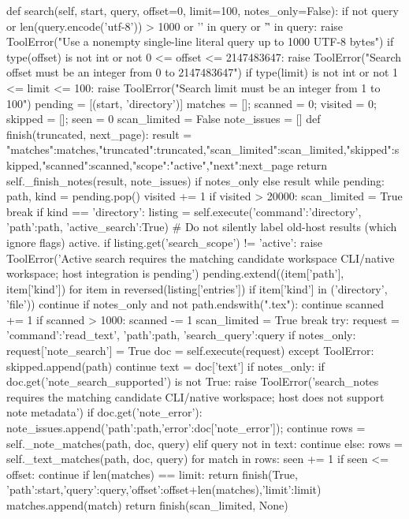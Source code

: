     def search(self, start, query, offset=0, limit=100, notes_only=False):
        if not query or len(query.encode('utf-8')) > 1000 or '\n' in query or '\r' in query:
            raise ToolError("Use a nonempty single-line literal query up to 1000 UTF-8 bytes")
        if type(offset) is not int or not 0 <= offset <= 2147483647:
            raise ToolError("Search offset must be an integer from 0 to 2147483647")
        if type(limit) is not int or not 1 <= limit <= 100:
            raise ToolError("Search limit must be an integer from 1 to 100")
        pending = [(start, 'directory')]
        matches = []; scanned = 0; visited = 0; skipped = []; seen = 0
        scan_limited = False
        note_issues = []
        def finish(truncated, next_page):
            result = {"matches":matches,"truncated":truncated,"scan_limited":scan_limited,"skipped":skipped,"scanned":scanned,"scope":"active","next":next_page}
            return self._finish_notes(result, note_issues) if notes_only else result
        while pending:
            path, kind = pending.pop()
            visited += 1
            if visited > 20000:
                scan_limited = True
                break
            if kind == 'directory':
                listing = self.execute({'command':'directory', 'path':path, 'active_search':True})
                # Do not silently label old-host results (which ignore flags) active.
                if listing.get('search_scope') != 'active':
                    raise ToolError('Active search requires the matching candidate workspace CLI/native workspace; host integration is pending')
                pending.extend((item['path'], item['kind']) for item in reversed(listing['entries'])
                               if item['kind'] in ('directory', 'file'))
                continue
            if notes_only and not path.endswith(".tex"):
                continue
            scanned += 1
            if scanned > 1000:
                scanned -= 1
                scan_limited = True
                break
            try:
                request = {'command':'read_text', 'path':path, 'search_query':query}
                if notes_only: request['note_search'] = True
                doc = self.execute(request)
            except ToolError:
                skipped.append(path)
                continue
            text = doc['text']
            if notes_only:
                if doc.get('note_search_supported') is not True:
                    raise ToolError('search_notes requires the matching candidate CLI/native workspace; host does not support note metadata')
                if doc.get('note_error'):
                    note_issues.append({'path':path,'error':doc['note_error']}); continue
                rows = self._note_matches(path, doc, query)
            elif query not in text:
                continue
            else:
                rows = self._text_matches(path, doc, query)
            for match in rows:
                seen += 1
                if seen <= offset: continue
                if len(matches) == limit:
                    return finish(True, {'path':start,'query':query,'offset':offset+len(matches),'limit':limit})
                matches.append(match)
        return finish(scan_limited, None)


